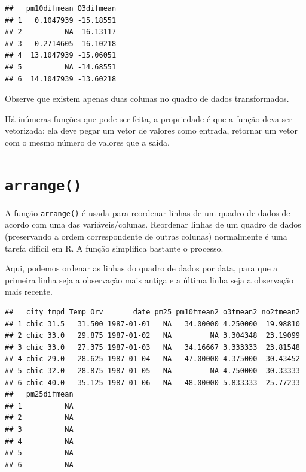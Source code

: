 \documentclass[a4paper]{book}
\newenvironment{Shaded}{\begin{snugshade}}{\end{snugshade}}
\newcommand{\KeywordTok}[1]{\textcolor[rgb]{0.13,0.29,0.53}{\textbf{#1}}}
\newcommand{\NormalTok}[1]{#1}
\newcommand{\OperatorTok}[1]{\textcolor[rgb]{0.81,0.36,0.00}{\textbf{#1}}}
\newcommand{\StringTok}[1]{\textcolor[rgb]{0.31,0.60,0.02}{#1}}
\begin{document}
\begin{verbatim}
##   pm10difmean O3difmean
## 1   0.1047939 -15.18551
## 2          NA -16.13117
## 3   0.2714605 -16.10218
## 4  13.1047939 -15.06051
## 5          NA -14.68551
## 6  14.1047939 -13.60218
\end{verbatim}

Observe que existem apenas duas colunas no quadro de dados transformados.

Há inúmeras funções que pode ser feita, a propriedade é que a função deva ser vetorizada: ela deve pegar um vetor de valores como entrada, retornar um vetor com o mesmo número de valores que a saída.

\hypertarget{arrange}{%
\section{\texorpdfstring{\texttt{arrange()}}{arrange()}}\label{arrange}}

A função \texttt{arrange()} é usada para reordenar linhas de um quadro de dados de acordo com uma das variáveis/colunas. Reordenar linhas de um quadro de dados (preservando a ordem correspondente de outras colunas) normalmente é uma tarefa difícil em R. A função simplifica bastante o processo.

Aqui, podemos ordenar as linhas do quadro de dados por data, para que a primeira linha seja a observação mais antiga e a última linha seja a observação mais recente.

\begin{Shaded}
\end{Shaded}

\begin{verbatim}
##   city tmpd Temp_Orv       date pm25 pm10tmean2 o3tmean2 no2tmean2
## 1 chic 31.5   31.500 1987-01-01   NA   34.00000 4.250000  19.98810
## 2 chic 33.0   29.875 1987-01-02   NA         NA 3.304348  23.19099
## 3 chic 33.0   27.375 1987-01-03   NA   34.16667 3.333333  23.81548
## 4 chic 29.0   28.625 1987-01-04   NA   47.00000 4.375000  30.43452
## 5 chic 32.0   28.875 1987-01-05   NA         NA 4.750000  30.33333
## 6 chic 40.0   35.125 1987-01-06   NA   48.00000 5.833333  25.77233
##   pm25difmean
## 1          NA
## 2          NA
## 3          NA
## 4          NA
## 5          NA
## 6          NA
\end{verbatim}
\end{document}
